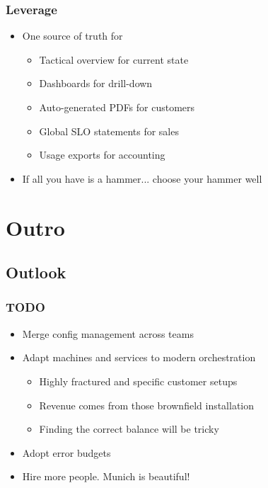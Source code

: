 \documentclass[t]{beamer}
\begin{document}
\begin{frame}
	\frametitle{Leverage}
	\begin{itemize}
		\item One source of truth for
		\begin{itemize}
			\item Tactical overview for current state
			\item Dashboards for drill-down
			\item Auto-generated PDFs for customers
			\item Global SLO statements for sales
			\item Usage exports for accounting
		\end{itemize}
	\item If all you have is a hammer... choose your hammer well
	\end{itemize}
\end{frame}



\section{Outro}

\subsection{Outlook}

\begin{frame}
	\frametitle{TODO}
	\begin{itemize}
		\item Merge config management across teams
		\item Adapt machines and services to modern orchestration
		\begin{itemize}
			\item Highly fractured and specific customer setups
			\item Revenue comes from those brownfield installation
			\item Finding the correct balance will be tricky
		\end{itemize}
		\item Adopt error budgets
		\item Hire more people. Munich is beautiful!
	\end{itemize}
\end{frame}
\end{document}
